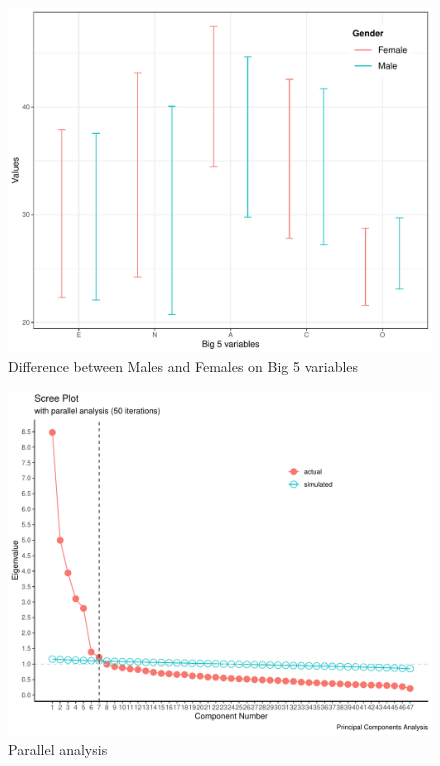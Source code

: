 \documentclass[
  english,
  man, fleqn, noextraspace]{apa6}
\begin{document}
\begin{figure}
\centering
\includegraphics{final_project_files/figure-latex/errorbars-1.pdf}
\caption{\label{fig:errorbars}Difference between Males and Females on Big 5 variables}
\end{figure}

\begin{figure}
\centering
\includegraphics{final_project_files/figure-latex/scree-1.pdf}
\caption{\label{fig:scree}Parallel analysis}
\end{figure}
\end{document}
